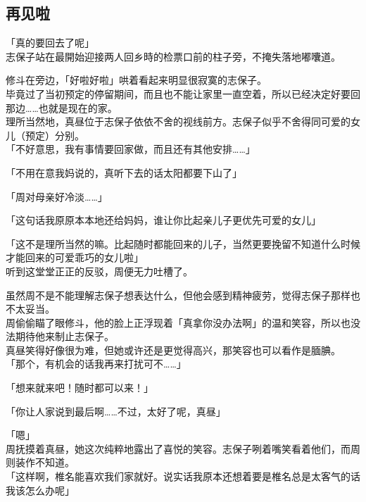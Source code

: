 \subsection{再见啦}

「真的要回去了呢」\\

志保子站在最開始迎接两人回乡時的检票口前的柱子旁，不掩失落地嘟囔道。

修斗在旁边，「好啦好啦」哄着看起来明显很寂寞的志保子。\\

毕竟过了当初预定的停留期间，而且也不能让家里一直空着，所以已经决定好要回那边……也就是现在的家。\\

理所当然地，真昼位于志保子依依不舍的视线前方。志保子似乎不舍得同可爱的女儿（预定）分别。\\

「不好意思，我有事情要回家做，而且还有其他安排……」

「不用在意我妈说的，真听下去的话太阳都要下山了」

「周对母亲好冷淡……」

「这句话我原原本本地还给妈妈，谁让你比起亲儿子更优先可爱的女儿」

「这不是理所当然的嘛。比起随时都能回来的儿子，当然更要挽留不知道什么时候才能回来的可爱乖巧的女儿啦」\\

听到这堂堂正正的反驳，周便无力吐槽了。

虽然周不是不能理解志保子想表达什么，但他会感到精神疲劳，觉得志保子那样也不太妥当。\\

周偷偷瞄了眼修斗，他的脸上正浮现着「真拿你没办法啊」的温和笑容，所以也没法期待他来制止志保子。\\

真昼笑得好像很为难，但她或许还是更觉得高兴，那笑容也可以看作是腼腆。\\

「那个，有机会的话我再来打扰可不……」

「想来就来吧！随时都可以来！」

「你让人家说到最后啊……不过，太好了呢，真昼」

「嗯」\\

周抚摸着真昼，她这次纯粹地露出了喜悦的笑容。志保子咧着嘴笑看着他们，而周则装作不知道。\\

「这样啊，椎名能喜欢我们家就好。说实话我原本还想着要是椎名总是太客气的话我该怎么办呢」


